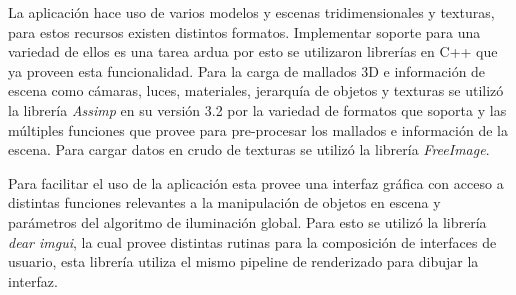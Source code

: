 La aplicación hace uso de varios modelos y escenas tridimensionales y texturas, para estos recursos existen distintos formatos. Implementar soporte para una variedad de ellos es una tarea ardua por esto se utilizaron librerías en C++ que ya proveen esta funcionalidad. Para la carga de mallados 3D e información de escena como cámaras, luces, materiales, jerarquía de objetos y texturas se utilizó la librería \emph{Assimp} en su versión 3.2 por la variedad de formatos que soporta y las múltiples funciones que provee para pre-procesar los mallados e información de la escena. Para cargar datos en crudo de texturas se utilizó la librería \emph{FreeImage}.

Para facilitar el uso de la aplicación esta provee una interfaz gráfica con acceso a distintas funciones relevantes a la manipulación de objetos en escena y parámetros del algoritmo de iluminación global. Para esto se utilizó la librería \emph{dear imgui}, la cual provee distintas rutinas para la composición de interfaces de usuario, esta librería utiliza el mismo pipeline de renderizado para dibujar la interfaz.
